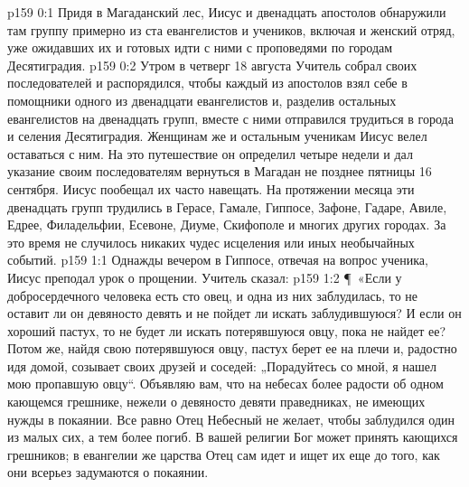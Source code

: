 \author{Комиссия срединников}
\vs p159 0:1 Придя в Магаданский лес, Иисус и двенадцать апостолов обнаружили там группу примерно из ста евангелистов и учеников, включая и женский отряд, уже ожидавших их и готовых идти с ними с проповедями по городам Десятиградия.
\vs p159 0:2 Утром в четверг 18 августа Учитель собрал своих последователей и распорядился, чтобы каждый из апостолов взял себе в помощники одного из двенадцати евангелистов и, разделив остальных евангелистов на двенадцать групп, вместе с ними отправился трудиться в города и селения Десятиградия. Женщинам же и остальным ученикам Иисус велел оставаться с ним. На это путешествие он определил четыре недели и дал указание своим последователям вернуться в Магадан не позднее пятницы 16 сентября. Иисус пообещал их часто навещать. На протяжении месяца эти двенадцать групп трудились в Герасе, Гамале, Гиппосе, Зафоне, Гадаре, Авиле, Едрее, Филадельфии, Есевоне, Диуме, Скифополе и многих других городах. За это время не случилось никаких чудес исцеления или иных необычайных событий.
\vs p159 1:1 Однажды вечером в Гиппосе, отвечая на вопрос ученика, Иисус преподал урок о прощении. Учитель сказал:
\vs p159 1:2 \P\ «Если у добросердечного человека есть сто овец, и одна из них заблудилась, то не оставит ли он девяносто девять и не пойдет ли искать заблудившуюся? И если он хороший пастух, то не будет ли искать потерявшуюся овцу, пока не найдет ее? Потом же, найдя свою потерявшуюся овцу, пастух берет ее на плечи и, радостно идя домой, созывает своих друзей и соседей: „Порадуйтесь со мной, я нашел мою пропавшую овцу“. Объявляю вам, что на небесах более радости об одном кающемся грешнике, нежели о девяносто девяти праведниках, не имеющих нужды в покаянии. Все равно Отец Небесный не желает, чтобы заблудился один из малых сих, а тем более погиб. В вашей религии Бог может принять кающихся грешников; в евангелии же царства Отец сам идет и ищет их еще до того, как они всерьез задумаются о покаянии.
